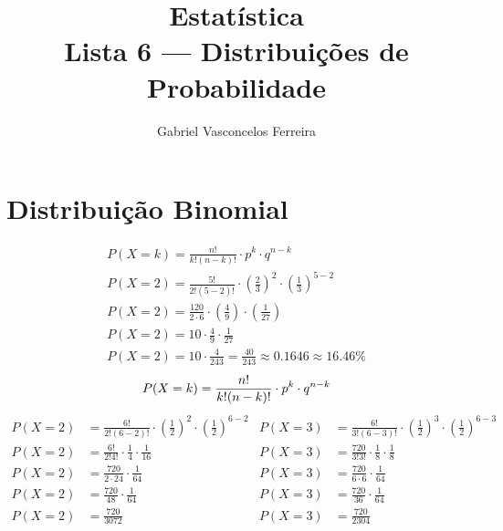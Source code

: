 \documentclass{jhwhw}
\begin{document}
\author{Gabriel Vasconcelos Ferreira}
\title{%
	Estatística\\Lista 6 --- Distribuições de Probabilidade\\
}
\maketitle
\section*{Distribuição Binomial}
\begin{gather*}
	P(X = k) = \frac{n!}{k!(n-k)!} \cdot p^k \cdot q^{n-k} \\
	P(X = 2) = \frac{5!}{2!(5-2)!} \cdot \left(\frac{2}{3}\right)^2 \cdot \left(\frac{1}{3}\right)^{5-2} \\
	P(X = 2) = \frac{120}{2 \cdot 6} \cdot \left(\frac{4}{9}\right) \cdot \left(\frac{1}{27}\right) \\
	P(X = 2) = 10 \cdot \frac{4}{9} \cdot \frac{1}{27} \\
	P(X = 2) = 10 \cdot \frac{4}{243} = \frac{40}{243} \approx 0.1646 \approx \boxed{16.46\%}
\end{gather*}
\[
	P(X = k) = \frac{n!}{k!(n-k)!} \cdot p^k \cdot q^{n-k}\\
\]
\begin{align*}
	P(X = 2) & = \frac{6!}{2!(6-2)!} \cdot \left(\frac{1}{2}\right)^2 \cdot \left(\frac{1}{2}\right)^{6-2} & P(X = 3) & = \frac{6!}{3!(6-3)!} \cdot \left(\frac{1}{2}\right)^3 \cdot \left(\frac{1}{2}\right)^{6-3} \\
	P(X = 2) & = \frac{6!}{2!4!} \cdot \frac{1}{4} \cdot \frac{1}{16}                                      & P(X = 3) & = \frac{720}{3!3!} \cdot \frac{1}{8} \cdot \frac{1}{8}                                      \\
	P(X = 2) & = \frac{720}{2 \cdot 24} \cdot \frac{1}{64}                                                 & P(X = 3) & = \frac{720}{6 \cdot 6} \cdot \frac{1}{64}                                                  \\
	P(X = 2) & = \frac{720}{48} \cdot \frac{1}{64}                                                         & P(X = 3) & = \frac{720}{36} \cdot \frac{1}{64}                                                         \\
	P(X = 2) & = \frac{720}{3072}                                                                          & P(X = 3) & = \frac{720}{2304}                                                                          \\
\end{align*}
\end{document}
